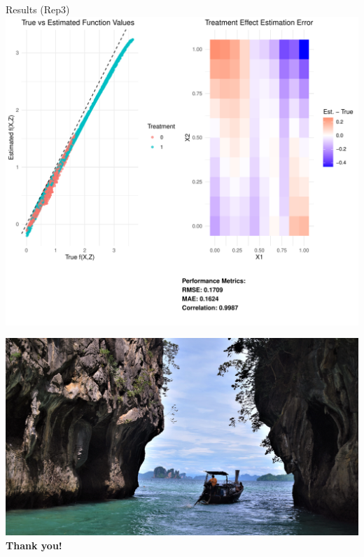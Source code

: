 \begin{frame}{Results (Rep3)}
  \includegraphics[height=.8\linewidth]{pics/Sim4_rep3_2.pdf}
\end{frame}

\begin{frame}{}
  \vspace{40pt}
  \centering
  \includegraphics{pics/thankyou.png}
  \Huge{\textbf{Thank you!}}
  \vspace{40pt}
\end{frame}

